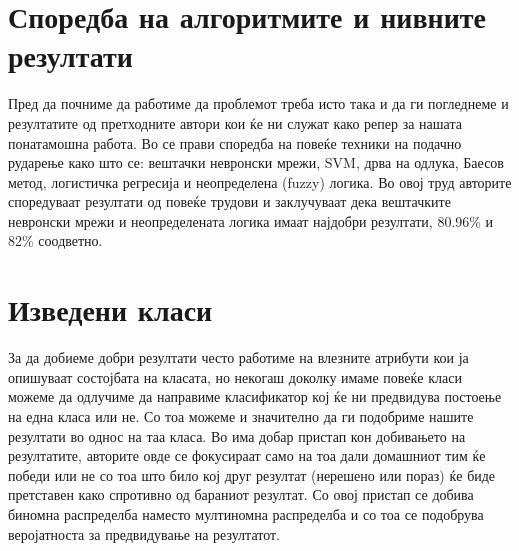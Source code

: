 \section{Споредба на алгоритмите и нивните резултати}
Пред да почниме да работиме да проблемот треба исто така и да ги погледнеме и резултатите од претходните автори кои ќе ни служат како репер за нашата понатамошна работа.
Во \cite{haghighat2013review} се прави споредба на повеќе техники на подачно рударење како што се: вештачки невронски мрежи, SVM, дрва на одлука, Баесов метод, логистичка регресија и неопределена (fuzzy) логика. Во овој труд авторите споредуваат резултати од повеќе трудови и заклучуваат дека вештачките невронски мрежи \cite{ivankovic2010analysis} и неопределената логика имаат најдобри резултати, 80.96\% и 82\% соодветно. 
\section{Изведени класи}
За да добиеме добри резултати често работиме на влезните атрибути кои ја опишуваат состојбата на класата, но некогаш доколку имаме повеќе класи можеме да одлучиме да направиме класификатор кој ќе ни предвидува постоење на една класа или не. Со тоа можеме и значително да ги подобриме нашите резултати во однос на таа класа. 
Во \cite{cheng2016predicting} има добар пристап кон добивањето на резултатите, авторите овде се фокусираат само на тоа дали домашниот тим ќе победи или не со тоа што било кој друг резултат (нерешено или пораз) ќе биде претставен како спротивно од бараниот резултат. Со овој пристап се добива биномна распределба наместо мултиномна распределба и со тоа се подобрува веројатноста за предвидување на резултатот.

